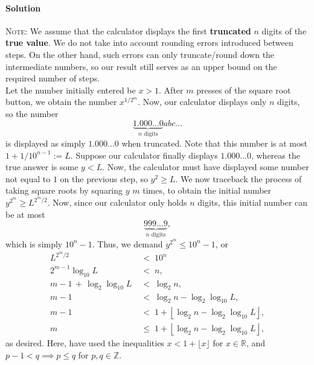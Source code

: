 \documentclass[10pt]{article}
\def\solution{\paragraph{Solution}}
\begin{document}
        \solution 
        \textsc{Note}: We assume that the calculator displays the first \textbf{truncated} $n$ digits of the \textbf{true value}.
        We do not take into account rounding errors introduced between steps. On the other hand, such errors can only truncate/round down
        the intermediate numbers, so our result still serves as an upper bound on the required number of steps. \\

        Let the number initially entered be $x > 1$. After $m$ presses of the square root button, we obtain the number $x^{1 /2^m}$.
        Now, our calculator displays only $n$ digits, so the number 
        \[
                \underbrace{1.000\dots 0}_{n\text{ digits}}abc\dots
        \]
        is displayed as simply $1.000\dots 0$ when truncated. Note that this number is at most $1 + 1 / 10^{n - 1} := L$.
        Suppose our calculator finally displays $1.000\dots 0$, whereas the true answer is some $y < L$.
        Now, the calculator must have displayed some number not equal to $1$ on the previous step, so $y^2 \geq L$.
        We now traceback the process of taking square roots by squaring $y$ $m$ times, to obtain the initial number $y^{2^m} \geq L^{2^m / 2}$.
        Now, since our calculator only holds $n$ digits, this initial number can be at most
        \[
                \underbrace{999\dots 9}_{n\text{ digits}},
        \]
        which is simply $10^n - 1$. Thus, we demand $y^{2^m} \leq 10^n - 1$, or
        \begin{align*}
                L^{2^m / 2} \;&<\; 10^n \\
                2^{m-1}\log_{10}{L} \;&<\; n, \\
                m - 1 \,+\, \log_2\log_{10}{L} \;&<\; \log_2{n}, \\
                m - 1 \;&<\; \log_2{n} - \log_2\log_{10}{L}, \\
                m - 1 \;&<\; 1 + \left\lfloor \log_2{n} - \log_2\log_{10}{L}\right\rfloor, \\
                m \;&\leq\; 1 + \left\lfloor \log_2{n} - \log_2\log_{10}{L}\right\rfloor,
        \end{align*}
        as desired. Here, have used the inequalities $x < 1 + \lfloor x\rfloor$ for $x \in \mathbb{R}$, and $p - 1 < q \implies p \leq q$ for
        $p, q \in \mathbb{Z}$. \\
        
\end{document}
